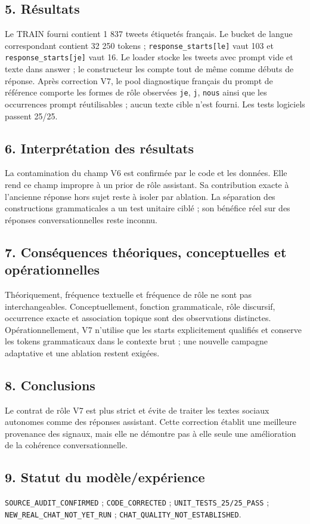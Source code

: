 \documentclass[11pt,a4paper]{report}
\begin{document}
\subsection{5. Résultats}
Le TRAIN fourni contient 1 837 tweets étiquetés français. Le bucket de langue correspondant contient 32 250 tokens ; \texttt{response\_starts[le]} vaut 103 et \texttt{response\_starts[je]} vaut 16. Le loader stocke les tweets avec prompt vide et texte dans answer ; le constructeur les compte tout de même comme débuts de réponse. Après correction V7, le pool diagnostique français du prompt de référence comporte les formes de rôle observées \texttt{je}, \texttt{j}, \texttt{nous} ainsi que les occurrences prompt réutilisables ; aucun texte cible n'est fourni. Les tests logiciels passent 25/25.
\subsection{6. Interprétation des résultats}
La contamination du champ V6 est confirmée par le code et les données. Elle rend ce champ impropre à un prior de rôle assistant. Sa contribution exacte à l'ancienne réponse hors sujet reste à isoler par ablation. La séparation des constructions grammaticales a un test unitaire ciblé ; son bénéfice réel sur des réponses conversationnelles reste inconnu.
\subsection{7. Conséquences théoriques, conceptuelles et opérationnelles}
Théoriquement, fréquence textuelle et fréquence de rôle ne sont pas interchangeables. Conceptuellement, fonction grammaticale, rôle discursif, occurrence exacte et association topique sont des observations distinctes. Opérationnellement, V7 n'utilise que les starts explicitement qualifiés et conserve les tokens grammaticaux dans le contexte brut ; une nouvelle campagne adaptative et une ablation restent exigées.
\subsection{8. Conclusions}
Le contrat de rôle V7 est plus strict et évite de traiter les textes sociaux autonomes comme des réponses assistant. Cette correction établit une meilleure provenance des signaux, mais elle ne démontre pas à elle seule une amélioration de la cohérence conversationnelle.
\subsection{9. Statut du modèle/expérience}
\texttt{SOURCE\_AUDIT\_CONFIRMED} ; \texttt{CODE\_CORRECTED} ; \texttt{UNIT\_TESTS\_25/25\_PASS} ;\\\texttt{NEW\_REAL\_CHAT\_NOT\_YET\_RUN} ; \texttt{CHAT\_QUALITY\_NOT\_ESTABLISHED}.
\end{document}
